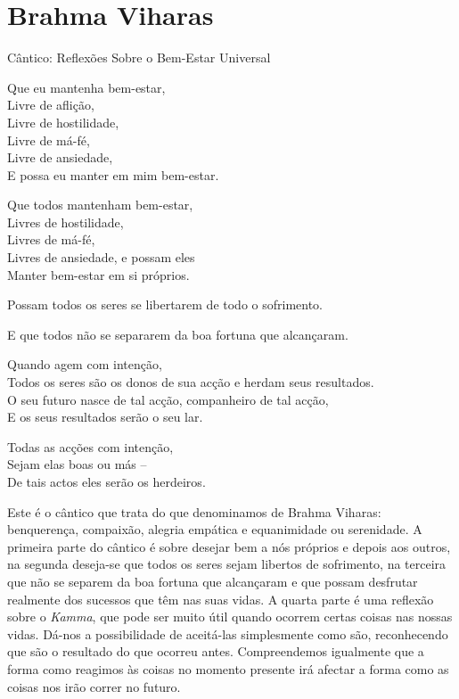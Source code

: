 \chapter{Brahma Viharas}

{\centering\sectionSize
Cântico: Reflexões Sobre o Bem-Estar Universal
\par}

{\itshape
\setlength{\parskip}{0.5\baselineskip}%
\setlength{\parindent}{0pt}%

Que eu mantenha bem-estar,\\
Livre de aflição,\\
Livre de hostilidade,\\
Livre de má-fé,\\
Livre de ansiedade,\\
E possa eu manter em mim bem-estar.

Que todos mantenham bem-estar,\\
Livres de hostilidade,\\
Livres de má-fé,\\
Livres de ansiedade, e possam eles\\
Manter bem-estar em si próprios.

Possam todos os seres se libertarem de todo o sofrimento.

E que todos não se separarem da boa fortuna que alcançaram.

Quando agem com intenção,\\
Todos os seres são os donos de sua acção e herdam seus resultados.\\
O seu futuro nasce de tal acção, companheiro de tal acção,\\
E os seus resultados serão o seu lar.

Todas as acções com intenção,\\
Sejam elas boas ou más --\\
De tais actos eles serão os herdeiros.

}

\bigskip

Este é o cântico que trata do que denominamos de Brahma Viharas:
benquerença, compaixão, alegria empática e equanimidade ou serenidade. A
primeira parte do cântico é sobre desejar bem a nós próprios e depois
aos outros, na segunda deseja-se que todos os seres sejam libertos de
sofrimento, na terceira que não se separem da boa fortuna que alcançaram
e que possam desfrutar realmente dos sucessos que têm nas suas vidas. A
quarta parte é uma reflexão sobre o \emph{Kamma}, que pode ser muito
útil quando ocorrem certas coisas nas nossas vidas. Dá-nos a
possibilidade de aceitá-las simplesmente como são, reconhecendo que são
o resultado do que ocorreu antes. Compreendemos igualmente que a forma
como reagimos às coisas no momento presente irá afectar a forma como as
coisas nos irão correr no futuro.

